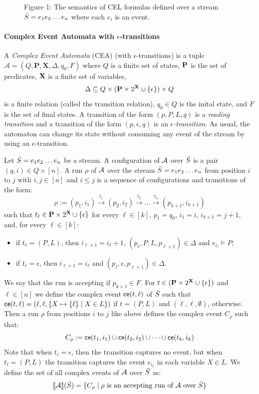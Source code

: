 \begin{figure}[t]
	\caption{Figure 1: The semantics of CEL formulas defined over a stream $\bar{S} = e_1 e_2\dots e_n$ where each $e_i$ is an event.}
\end{figure}

\paragraph{Complex Event Automata with $\epsilon$-transitions} A \textit{Complex Event Automata} (CEA) (with $\epsilon$-transitions) is a tuple $
\mathcal{A} = (Q,\textbf{P},\textbf{X},\Delta,q_0,F)
$
where $Q$ is a finite set of states, $\mathbf{P}$ is the set of predicates, $\mathbf{X}$ is a finite set of variables,
\[
\Delta \subseteq Q \times (\mathbf{P} \times 2^{\mathbf{X}} \cup \{\epsilon\}) \times Q  
\] is a finite relation (called the transition relation), $q_0 \in Q$ is the inital state, and $F$ is the set of final states. A transition of the form $(p, P, L, q)$ is a \emph{reading transition} and a transition of the form $(p, \epsilon, q)$ is an \emph{$\epsilon$-transition}. As usual, the automaton can change its state without consuming any event of the stream by using an $\epsilon$-transition.

Let $\bar{S} = e_1 e_2 \ldots e_n$ be a stream. A configuration of $\mathcal{A}$ over $\bar{S}$ is a pair $(q, i) \in Q \times [n]$.
A run $\rho$ of $\mathcal{A}$ over the stream $\bar{S} = e_1 e_2 \dots e_n$ from position $i$ to $j$ with $i, j \in [n]$ and $i \leq j$ is a sequence of configurations and transitions of the form:
\[ 
\rho := (p_1, i_1) \xrightarrow{t_1} (p_{2}, i_2) \xrightarrow{t_2} \dots \xrightarrow{t_k} (p_{k+1}, i_{k+1}) 
\]
such that $t_\ell \in \mathbf{P} \times 2^{\mathbf{X}} \cup \{\epsilon\}$ for every $\ell \in [k]$, $p_1 = q_0$, $i_1 = i$, $i_{k+1} = j+1$, and, for every $\ell \in [k]$:
\begin{itemize}
	\item if $t_\ell = (P, L)$, then $i_{\ell+1} = i_{\ell}+1$, $(p_{\ell}, P, L, p_{\ell+1}) \in \Delta$ and $e_{i_{\ell}} \vDash P$;
	\item if $t_\ell = \epsilon$, then $i_{\ell+1} = i_{\ell}$ and $(p_{\ell}, \epsilon, p_{\ell+1}) \in \Delta$.
\end{itemize}
We say that the run is accepting if $p_{k+1} \in F$.
For $t \in (\mathbf{P} \times 2^{\mathbf{X}} \cup \{\epsilon\})$ and $\ell \in [n]$ we define the complex event $\mathsf{ce}(t, \ell)$ of $\bar{S}$ such that $\mathsf{ce}(t, \ell) = (\ell, \ell, \{X \mapsto \{\ell\} \mid X \in L\})$ if $t = (P,L)$ and $(\ell, \ell, \emptyset)$, otherwise.
Then a run $\rho$ from positions $i$ to $j$ like above defines the complex event $C_\rho$ such that:
\[
C_\rho := \mathsf{ce}(t_1, i_1) \cup \mathsf{ce}(t_2, i_2) \cup \dots \cup \mathsf{ce}(t_k, i_k)
\]
Note that when $t_\ell = \epsilon$, then the transition captures no event, but when $t_\ell = (P, L)$ the transition captures the event $e_{i_\ell}$ in each variable $X \in L$. We define the set of all complex events of $\mathcal{A}$ over $\bar{S}$ as:  
\[ \sem{\cA}(\Stream) = \{C_\rho \mid \rho \text{ is an accepting run of } \cA \text{ over } \Stream\} \]